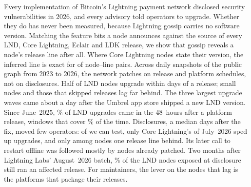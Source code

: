 Every implementation of Bitcoin's Lightning payment network disclosed security vulnerabilities in 2026, and every
advisory told operators to upgrade. Whether they do has never been measured, because Lightning gossip carries no software version. Matching the
feature bits a node announces against the source of every LND, Core Lightning, Eclair and LDK release, we show that
gossip reveals a node's release line after all. Where Core Lightning nodes state their version, the inferred line is
exact for \NVerNodeLinesExact{} of \NVerNodeLines{} node--line pairs. Across \DataUsableDays{} daily snapshots of the
public graph from 2023 to 2026, the network patches on release and platform schedules, not on disclosures. Half of
LND nodes upgrade within \MedianLNDAll{} days of a release; small nodes and those that skipped releases lag far
behind. The three largest upgrade waves came about a day after the Umbrel app store shipped a new LND version. Since
June~2025, \PlatShareLND\% of LND upgrades came in the 48~hours after a platform release, windows that cover
\PlatTimeLND\% of the time. Disclosures, a median \FixToDiscMedian{} days after the fix, moved few operators: of
\NResp{} we can test, only Core Lightning's of July~2026 sped up upgrades, and only among nodes one release line
behind. Its later call to restart offline was followed mostly by nodes already patched. Two months after Lightning
Labs' August~2026 batch, \PctCohortStillLLBatch\% of the LND nodes exposed at disclosure still ran an affected
release. For maintainers, the lever on the nodes that lag is the platforms that package their releases.
